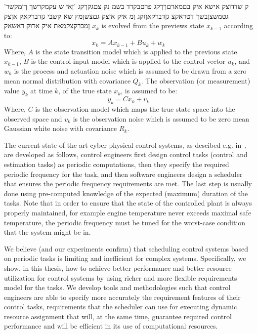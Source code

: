 \documentclass[ twoside, 12pt ]{article}
\begin{document}
'ק שדדוצק אישא איק בםמארםךךקג פרםבקדד בשמ נק צםגקךקג 'ןאי ש עקמקרשך ךןמקשר גטמשצןבשך דטדאקצ גןדברקאןזקג ןמ איק אןצק גםצשןמץ שא קשבי גןדברקאק אןצק ןמברקצקמאת איק ארוק דאשאק $x_k$ is evolved from the previews state $x_{k-1}$ according to: $$ x_{k}=Ax_{k-1} + Bu_{k} + w_{k} $$ Where, $A$ is the state transition model which is applied to the previous state $x_{k-1}$, $B$ is the control-input model which is applied to the control vector $u_k$, and $w_k$ is the process and actuation noise which is assumed to be drawn from a zero mean normal distribution with covariance $Q_k$. The observation (or measurement) value $y_k$ at time $k$, of the true state $x_k$, is assumed to be: $$y_k=Cx_k+v_k$$ Where, $C$ is the observation model which maps the true state space into the observed space and $v_k$ is the observation noise which is assumed to be zero mean Gaussian white noise with covariance $R_k$.

The current state-of-the-art cyber-physical control systems, as descibed e.g. in~\cite{Celvin}, are developed as follows, control engineers first design control tasks (control and estimation tasks) as periodic computations, then they specify the required periodic frequency for the task, and then software engineers design a scheduler that ensures the periodic frequency requirements are met. The last step is usually done using pre-computed knowledge of the expected (maximum) duration of the tasks. Note that in order to ensure that the state of the controlled plant is always properly maintained, for example engine temperature never exceeds maximal safe temperature, the periodic frequency must be tuned for the worst-case condition that the system might be in.

We believe (and our experiments confirm) that scheduling control systems based on periodic tasks is limiting and inefficient for complex systems. Specifically, we show, in this thesis, how to achieve better performance and better resource utilization for control systems by using richer and more flexible requirements model for the tasks. We develop tools and methodologies such that control engineers are able to specify more accurately the requirement features of their control tasks, requirements that the scheduler can use for executing dynamic resource assignment that will, at the same time, guarantee required control performance and will be efficient in its use of computational resources.
\end{document}
